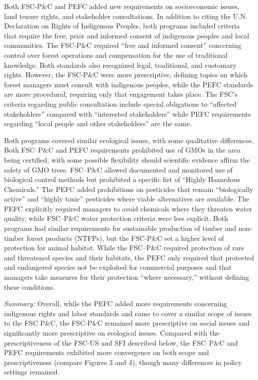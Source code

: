 \documentclass[
      12pt,
            Review ]{article}
\begin{document}
Both FSC-P\&C and PEFC added new requirements on socioeconomic issues, land tenure rights, and stakeholder consultations. In addition to citing the U.N. Declaration on Rights of Indigenous Peoples, both programs included criteria that require the free, prior and informed consent of indigenous peoples and local communities. The FSC-P\&C required ``free and informed consent'' concerning control over forest operations and compensation for the use of traditional knowledge. Both standards also recognized legal, traditional, and customary rights. However, the FSC-P\&C were more prescriptive, defining topics on which forest managers must consult with indigenous peoples, while the PEFC standards are more procedural, requiring only that engagement takes place. The FSC's criteria regarding public consultation include special obligations to ``affected stakeholders'' compared with ``interested stakeholders'' while PEFC requirements regarding ``local people and other stakeholders'' are the same.

Both programs covered similar ecological issues, with some qualitative differences. Both FSC--P\&C and PEFC requirements prohibited use of GMOs in the area being certified, with some possible flexibility should scientific evidence affirm the safety of GMO trees. FSC--P\&C allowed documented and monitored use of biological control methods but prohibited a specific list of ``Highly Hazardous Chemicals.'' The PEFC added prohibitions on pesticides that remain ``biologically active'' and ``highly toxic'' pesticides where viable alternatives are available. The PEFC explicitly required managers to avoid chemicals where they threaten water quality, while FSC--P\&C water protection criteria were less explicit. Both programs had similar requirements for sustainable production of timber and non-timber forest products (NTFPs), but the FSC-P\&C set a higher level of protection for animal habitat. While the FSC--P\&C required protection of rare and threatened species and their habitats, the PEFC only required that protected and endangered species not be exploited for commercial purposes and that managers take measures for their protection ``where necessary,'' without defining these conditions.

\emph{Summary:} Overall, while the PEFC added more requirements concerning indigenous rights and labor standards and came to cover a similar scope of issues to the FSC P\&C, the FSC-P\&C remained more prescriptive on social issues and significantly more prescriptive on ecological issues. Compared with the prescriptiveness of the FSC-US and SFI described below, the FSC--P\&C and PEFC requirements exhibited more convergence on both scope and prescriptiveness (compare Figures 3 and 4), though many differences in policy settings remained.
\end{document}
